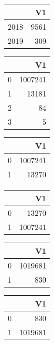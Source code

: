 \bigskip\bigskip
\centering
\begin{tabular}{rr}
  \hline
 & V1 \\ 
  \hline
2018 & 9561 \\ 
  2019 & 309 \\ 
   \hline
\end{tabular}

\bigskip\bigskip
\centering
\begin{tabular}{rr}
  \hline
 & V1 \\ 
  \hline
0 & 1007241 \\ 
  1 & 13181 \\ 
  2 &  84 \\ 
  3 &   5 \\ 
   \hline
\end{tabular}

\bigskip\bigskip
\centering
\begin{tabular}{rr}
  \hline
 & V1 \\ 
  \hline
0 & 1007241 \\ 
  1 & 13270 \\ 
   \hline
\end{tabular}

\bigskip\bigskip
\centering
\begin{tabular}{rr}
  \hline
 & V1 \\ 
  \hline
0 & 13270 \\ 
  1 & 1007241 \\ 
   \hline
\end{tabular}

\bigskip\bigskip
\centering
\begin{tabular}{rr}
  \hline
 & V1 \\ 
  \hline
0 & 1019681 \\ 
  1 & 830 \\ 
   \hline
\end{tabular}

\bigskip\bigskip
\centering
\begin{tabular}{rr}
  \hline
 & V1 \\ 
  \hline
0 & 830 \\ 
  1 & 1019681 \\ 
   \hline
\end{tabular}

